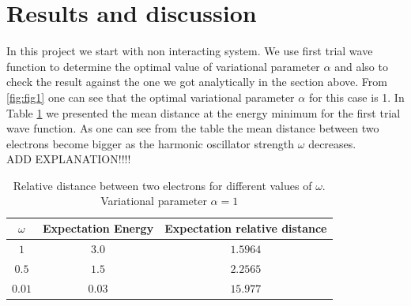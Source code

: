 \documentclass[10pt]{article}
\begin{document}
\newpage
\section{Results and discussion}\label{results}

In this project we start with non interacting system. We use first trial wave function to determine the optimal value of variational parameter $\alpha$ and also to check the result against the one we got analytically in the section above. From \ref{fig:fig1} one can see that the optimal variational parameter $\alpha$ for this case is 1. In Table \ref{tab:one} we presented the mean distance at the energy minimum for the first trial wave function. As one can see from the table the mean distance between two electrons become bigger as the harmonic oscillator strength $\omega$ decreases. \\
ADD EXPLANATION!!!!

\begin{table}[h!]
  \caption{Relative distance between two electrons for different values of $\omega$. Variational parameter $\alpha =1$}
  \label{tab:one}
  \begin{center}
    \begin{tabular}{c|c|c}
    \hline
		$\omega$& Expectation Energy & Expectation relative distance \\
    \hline
	$	1 $  & $3.0$ & $1.5964$  \\
	$	0.5$  & $1.5$ & $2.2565$   \\
	$	0.01$  & $0.03$ &  $15.977$   \\
	\end{tabular}
  \end{center}
\end{table}
\end{document}
